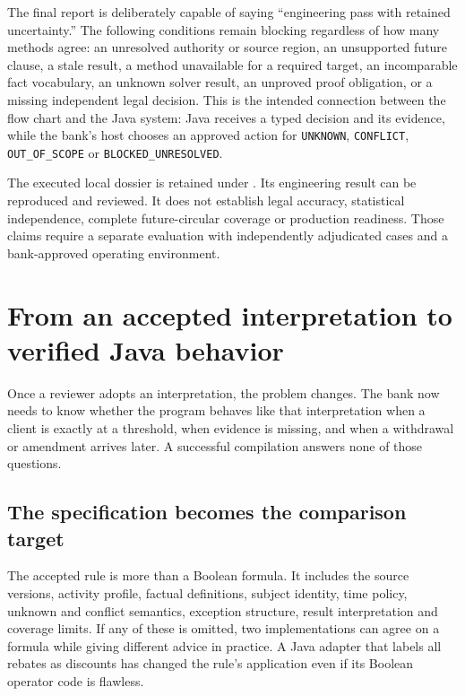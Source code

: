 \documentclass[12pt,a4paper,oneside,openany]{book}
\begin{document}
The final report is deliberately capable of saying ``engineering pass with
retained uncertainty.'' The following conditions remain blocking regardless of
how many methods agree: an unresolved authority or source region, an unsupported
future clause, a stale result, a method unavailable for a required target, an
incomparable fact vocabulary, an unknown solver result, an unproved proof
obligation, or a missing independent legal decision. This is the intended
connection between the flow chart and the Java system: Java receives a typed
decision and its evidence, while the bank's host chooses an approved action for
\texttt{UNKNOWN}, \texttt{CONFLICT}, \texttt{OUT\_OF\_SCOPE} or
\texttt{BLOCKED\_UNRESOLVED}.

The executed local dossier is retained under
. Its engineering result can be
reproduced and reviewed. It does not establish legal accuracy, statistical
independence, complete future-circular coverage or production readiness. Those
claims require a separate evaluation with independently adjudicated cases and a
bank-approved operating environment.


\chapter{From an accepted interpretation to verified Java behavior}
\label{ch:verification}

Once a reviewer adopts an interpretation, the problem changes. The bank now
needs to know whether the program behaves like that interpretation when a client
is exactly at a threshold, when evidence is missing, and when a withdrawal or
amendment arrives later. A successful compilation answers none of those
questions.

\section{The specification becomes the comparison target}
\label{merge:M07:00}


The accepted rule is more than a Boolean formula. It includes the source
versions, activity profile, factual definitions, subject identity, time policy,
unknown and conflict semantics, exception structure, result interpretation and
coverage limits. If any of these is omitted, two implementations can agree on a
formula while giving different advice in practice. A Java adapter that labels
all rebates as discounts has changed the rule's application even if its Boolean
operator code is flawless.
\end{document}

